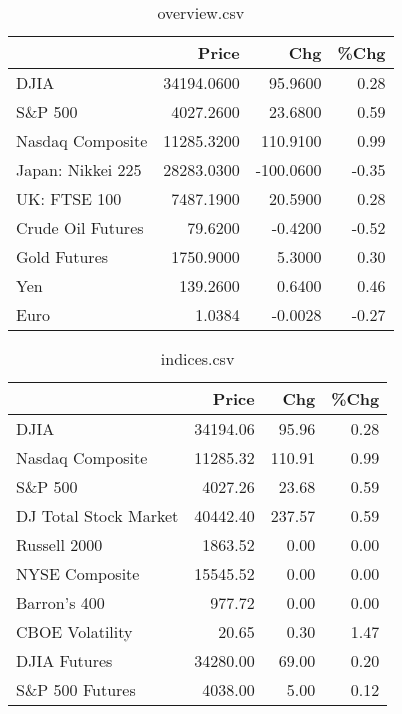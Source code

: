 \documentclass{article}%
\begin{document}
\begin{table}[htbp]%
\caption{overview.csv}%
\centering%
\begin{adjustbox}{width=1\textwidth}%
\begin{tabular}{lrrr}
\toprule
                  &      Price &       Chg &  \%Chg \\
\midrule
             DJIA & 34194.0600 &   95.9600 &  0.28 \\
          S\&P 500 &  4027.2600 &   23.6800 &  0.59 \\
 Nasdaq Composite & 11285.3200 &  110.9100 &  0.99 \\
Japan: Nikkei 225 & 28283.0300 & -100.0600 & -0.35 \\
     UK: FTSE 100 &  7487.1900 &   20.5900 &  0.28 \\
Crude Oil Futures &    79.6200 &   -0.4200 & -0.52 \\
     Gold Futures &  1750.9000 &    5.3000 &  0.30 \\
              Yen &   139.2600 &    0.6400 &  0.46 \\
             Euro &     1.0384 &   -0.0028 & -0.27 \\
\bottomrule
\end{tabular}
%
\end{adjustbox}%
\end{table}

%


\begin{table}[htbp]%
\caption{indices.csv}%
\centering%
\begin{adjustbox}{width=1\textwidth}%
\begin{tabular}{lrrr}
\toprule
                      &    Price &    Chg &  \%Chg \\
\midrule
                 DJIA & 34194.06 &  95.96 &  0.28 \\
     Nasdaq Composite & 11285.32 & 110.91 &  0.99 \\
              S\&P 500 &  4027.26 &  23.68 &  0.59 \\
DJ Total Stock Market & 40442.40 & 237.57 &  0.59 \\
         Russell 2000 &  1863.52 &   0.00 &  0.00 \\
       NYSE Composite & 15545.52 &   0.00 &  0.00 \\
         Barron's 400 &   977.72 &   0.00 &  0.00 \\
      CBOE Volatility &    20.65 &   0.30 &  1.47 \\
         DJIA Futures & 34280.00 &  69.00 &  0.20 \\
      S\&P 500 Futures &  4038.00 &   5.00 &  0.12 \\
\bottomrule
\end{tabular}
%
\end{adjustbox}%
\end{table}
\end{document}

